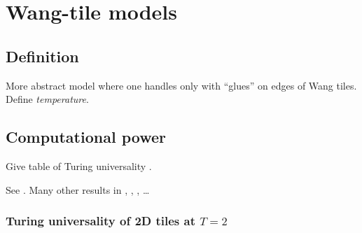 
\section{Wang-tile models}

\subsection{Definition}
	
	More abstract model where one handles only with ``glues'' on edges of Wang tiles. Define {\em temperature}.

\subsection{Computational power}
	
	Give table of Turing universality \cite{cook_temp1}.
	
	See \cite{winfree_phd}. Many other results in \cite{cook_temp1}, \cite{stage_assembly}, \cite{square_lb}, \cite{square_ub} \ldots
	
	\subsubsection{Turing universality of 2D tiles at $T=2$}
		
